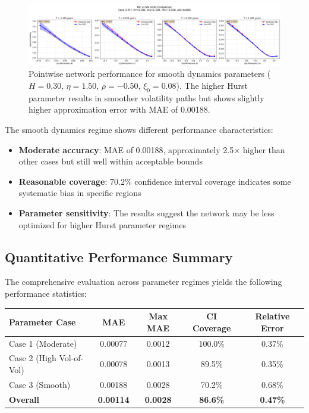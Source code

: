 	\begin{figure}[ht]
		\centering
		\includegraphics[width=\textwidth]{../images/pointwise_case3_comparison.png}
		\caption{Pointwise network performance for smooth dynamics parameters ($H = 0.30$, $\eta = 1.50$, $\rho = -0.50$, $\xi_0 = 0.08$). The higher Hurst parameter results in smoother volatility paths but shows slightly higher approximation error with MAE of 0.00188.}
		\label{fig:pointwise-case3}
	\end{figure}
				
	The smooth dynamics regime shows different performance characteristics:
	
	\begin{itemize}[nosep]
		\item \textbf{Moderate accuracy}: MAE of 0.00188, approximately 2.5× higher than other cases but still well within acceptable bounds
		\item \textbf{Reasonable coverage}: 70.2\% confidence interval coverage indicates some systematic bias in specific regions
		\item \textbf{Parameter sensitivity}: The results suggest the network may be less optimized for higher Hurst parameter regimes
	\end{itemize}
				
	\subsection{Quantitative Performance Summary}
	
	The comprehensive evaluation across parameter regimes yields the following performance statistics:
	
	\begin{center}
		\begin{tabular}{@{}lcccc@{}}
			\toprule
			\textbf{Parameter Case} & \textbf{MAE} & \textbf{Max MAE} & \textbf{CI Coverage} & \textbf{Relative Error} \\
			\midrule
			Case 1 (Moderate) & 0.00077 & 0.0012 & 100.0\% & 0.37\% \\
			Case 2 (High Vol-of-Vol) & 0.00078 & 0.0013 & 89.5\% & 0.35\% \\
			Case 3 (Smooth) & 0.00188 & 0.0028 & 70.2\% & 0.68\% \\
			\midrule
			\textbf{Overall} & \textbf{0.00114} & \textbf{0.0028} & \textbf{86.6\%} & \textbf{0.47\%} \\
			\bottomrule
		\end{tabular}
	\end{center}
	
	\printbibliography

